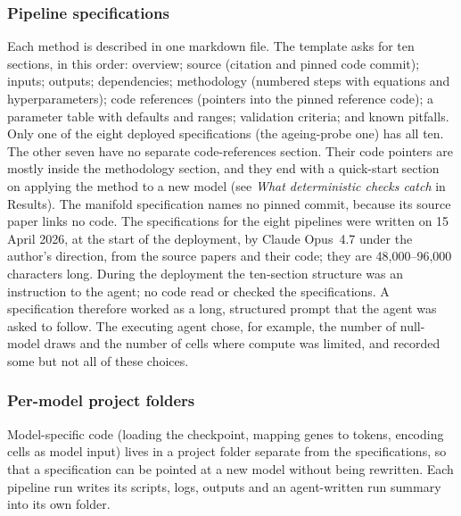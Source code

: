 \documentclass[10pt,letterpaper]{article}
\begin{document}
\subsubsection*{Pipeline specifications}
Each method is described in one markdown file. The template asks for
ten sections, in this order: overview; source (citation and pinned code
commit); inputs; outputs; dependencies; methodology (numbered steps with
equations and hyperparameters); code references (pointers into the pinned
reference code); a parameter table with defaults and ranges; validation
criteria; and known pitfalls. Only one of the eight deployed
specifications (the ageing-probe one) has all ten. The other seven have
no separate code-references section. Their code pointers are mostly inside
the methodology section, and they end with a quick-start section on
applying the method to a new model (see \emph{What deterministic checks
catch} in Results). The manifold specification names no pinned commit,
because its source paper links no code. The specifications for the eight
pipelines were written on 15 April 2026, at the start of the deployment,
by Claude Opus~4.7 under the author's direction, from the source papers
and their code; they are 48,000--96,000 characters long. During the deployment the ten-section
structure was an instruction to the agent; no code read or checked the
specifications. A specification therefore worked as a long, structured
prompt that the agent was asked to follow. The executing agent chose, for
example, the number of null-model draws and the number of cells where
compute was limited, and recorded some but not all of these choices.

\subsubsection*{Per-model project folders}
Model-specific code (loading the checkpoint, mapping genes to tokens,
encoding cells as model input) lives in a project folder separate from the
specifications, so that a specification can be pointed at a new model
without being rewritten. Each pipeline run writes its scripts, logs,
outputs and an agent-written run summary into its own folder.
\end{document}
